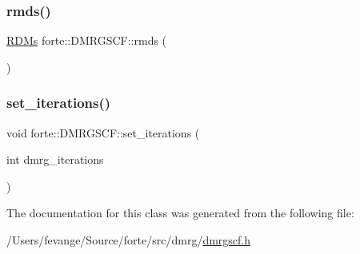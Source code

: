 \mbox{\label{classforte_1_1_d_m_r_g_s_c_f_a70de6c01bece616cd3ae66d337bc9b2f}} 
\subsubsection{\texorpdfstring{rmds()}{rmds()}}
{\footnotesize\ttfamily \mbox{\hyperlink{classforte_1_1_r_d_ms}{R\+D\+Ms}} forte\+::\+D\+M\+R\+G\+S\+C\+F\+::rmds (\begin{DoxyParamCaption}{ }\end{DoxyParamCaption})\hspace{0.3cm}{\ttfamily [inline]}}

\mbox{\label{classforte_1_1_d_m_r_g_s_c_f_ad4ba1745cefafba8b6d417ce4dbd9489}} 
\subsubsection{\texorpdfstring{set\+\_\+iterations()}{set\_iterations()}}
{\footnotesize\ttfamily void forte\+::\+D\+M\+R\+G\+S\+C\+F\+::set\+\_\+iterations (\begin{DoxyParamCaption}\item[{int}]{dmrg\+\_\+iterations }\end{DoxyParamCaption})\hspace{0.3cm}{\ttfamily [inline]}}



The documentation for this class was generated from the following file\+:\begin{DoxyCompactItemize}
\item 
/\+Users/fevange/\+Source/forte/src/dmrg/\mbox{\hyperlink{dmrgscf_8h}{dmrgscf.\+h}}\end{DoxyCompactItemize}
